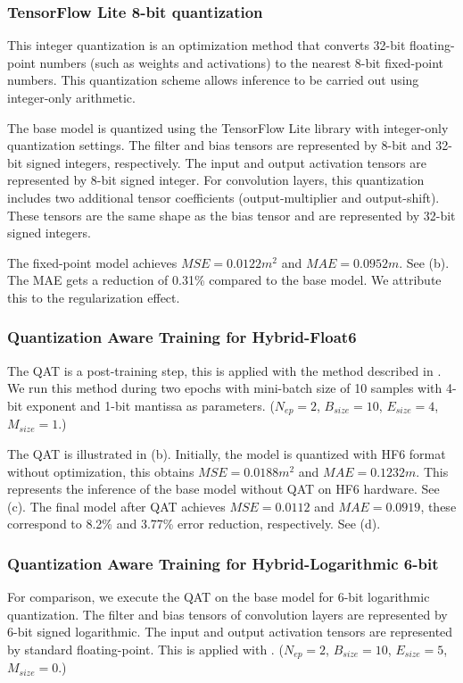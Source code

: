 \subsubsection{TensorFlow Lite 8-bit quantization}
This integer quantization is an optimization method that converts 32-bit floating-point numbers (such as weights and activations) to the nearest 8-bit fixed-point numbers. This quantization scheme allows inference to be carried out using integer-only arithmetic\cite{hannwindowsine}.

The base model is quantized using the TensorFlow Lite library with integer-only quantization settings. The filter and bias tensors are represented by 8-bit and 32-bit signed integers, respectively. The input and output activation tensors are represented by 8-bit signed integer. For convolution layers, this quantization includes two additional tensor coefficients (output-multiplier and output-shift). These tensors are the same shape as the bias tensor and are represented by 32-bit signed integers.

The fixed-point model achieves $MSE=0.0122 m^2$ and $MAE=0.0952m$. See (b). The MAE gets a reduction of 0.31\% compared to the base model. We attribute this to the regularization effect.

\subsubsection{Quantization Aware Training for Hybrid-Float6}
The QAT is a post-training step, this is applied with the method described in . We run this method during two epochs with mini-batch size of 10 samples with 4-bit exponent and 1-bit mantissa as parameters. ($N_{ep}=2$, $B_{size}=10$, $E_{size}=4$, $M_{size}=1$.)

The QAT is illustrated in (b). Initially, the model is quantized with HF6 format without optimization, this obtains $MSE=0.0188m^2$ and $MAE=0.1232m$. This represents the inference of the base model without QAT on HF6 hardware. See (c). The final model after QAT achieves $MSE=0.0112$ and $MAE=0.0919$, these correspond to 8.2\% and 3.77\% error reduction, respectively. See (d).

\subsubsection{Quantization Aware Training for Hybrid-Logarithmic 6-bit}
For comparison, we execute the QAT on the base model for 6-bit logarithmic quantization. The filter and bias tensors of convolution layers are represented by 6-bit signed logarithmic. The input and output activation tensors are represented by standard floating-point. This is applied with . ($N_{ep}=2$, $B_{size}=10$, $E_{size}=5$, $M_{size}=0$.)

